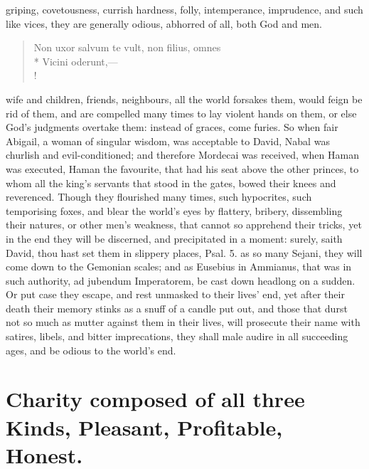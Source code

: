 {griping, covetousness, currish hardness, folly, intemperance,
imprudence, and such like vices, they are generally odious, abhorred of
all, both God and men.
%
\begin{latin}
\begin{verse}
Non uxor salvum te vult, non filius, omnes\\*
Vicini oderunt,---\\!
\end{verse}
\end{latin}
%
wife and children, friends, neighbours, all the world forsakes them,
would feign be rid of them, and are compelled many times to lay violent
hands on them, or else God's judgments overtake them: instead of
graces, come furies. So when fair Abigail, a woman of singular
wisdom, was acceptable to David, Nabal was churlish and
evil-conditioned; and therefore Mordecai was received, when Haman
was executed, Haman the favourite, that had his seat above the other
princes, to whom all the king's servants that stood in the gates, bowed
their knees and reverenced. Though they flourished many times, such
hypocrites, such temporising foxes, and blear the world's eyes by
flattery, bribery, dissembling their natures, or other men's weakness,
that cannot so apprehend their tricks, yet in the end they will be
discerned, and precipitated in a moment: surely, saith David, thou hast
set them in slippery places, Psal.  5. as so many Sejani, they
will come down to the Gemonian scales; and as Eusebius in 
Ammianus, that was in such authority, ad jubendum Imperatorem, be cast
down headlong on a sudden. Or put case they escape, and rest unmasked
to their lives' end, yet after their death their memory stinks as a
snuff of a candle put out, and those that durst not so much as mutter
against them in their lives, will prosecute their name with satires,
libels, and bitter imprecations, they shall male audire in all
succeeding ages, and be odious to the world's end.


\section[Charity]{Charity composed of all three Kinds, Pleasant, Profitable, Honest.}

}
